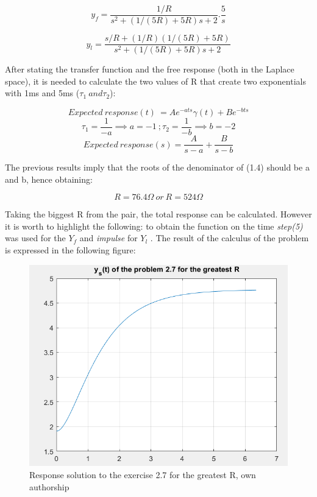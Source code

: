 \documentclass[a4paper,12pt]{article}
\begin{document}
\begin{equation}
    y_f = \frac{1/R}{s^2 + (1/(5R) + 5R)s + 2} . \frac{5}{s}
\end{equation}

\begin{equation}
    y_l = \frac{s/R + (1/R)(1/(5R) + 5R)}{s^2 + (1/(5R) + 5R)s + 2}
\end{equation}

\vspace{0.5cm}

After stating the transfer function and the free response (both in the Laplace space), it is needed to calculate the two values of R that create two exponentials with 1ms and 5ms (\(\tau_1 \ and \tau_2\)):

\vspace{0.5cm}

\[ Expected \ response(t) \ = Ae^{-ats}\gamma(t) + Be^{-bts} \]
\[\tau_1 = \frac{1}{-a} \implies a = -1 \ ; \tau_2 = \frac{1}{-b} \implies b = -2\]
\[Expected \ response(s) = \frac{A}{s-a} + \frac{B}{s-b}\]

\vspace{0.5cm}

The previous results imply that the roots of the denominator of (1.4) should be a and b, hence obtaining:

\vspace{0.5cm}

\[R = 76.4\Omega \ or \ R = 524\Omega\]

\newpage

Taking the biggest R from the pair, the total response can be calculated. However it is worth to highlight the following: to obtain the function on the time \textit{step(5)} was used for the \(Y_f\) and \textit{impulse} for \(Y_l\) . The result of the calculus of the problem is expressed in the following figure:

\vspace{0.5cm}

\begin{figure}[H]
    \centering
    \includegraphics[width=0.35\linewidth]{solution.png}
    \caption{Response solution to the exercise 2.7 for the greatest R, own authorship}
    \label{fig:2-7-sol-response}
\end{figure}
\end{document}
